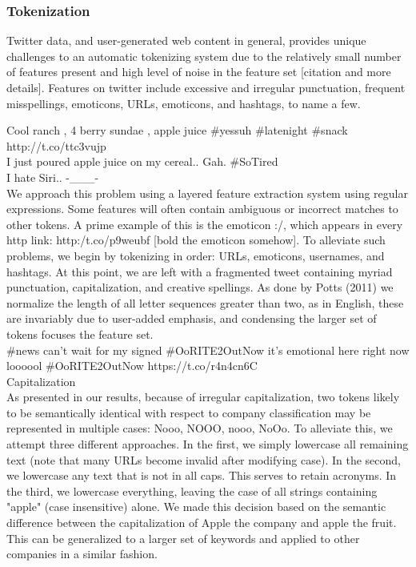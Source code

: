 \documentclass[letterpaper]{article}
\begin{document}
\subsubsection{Tokenization}
Twitter data, and user-generated web content in general, provides unique challenges to an automatic tokenizing system due to the relatively small number of features present and high level of noise in the feature set [citation and more details]. Features on twitter include excessive and irregular punctuation, frequent misspellings, emoticons, URLs, emoticons, and hashtags, to name a few.

Cool ranch , 4 berry sundae , apple juice #yessuh #latenight #snack http://t.co/ttc3vujp \\
I just poured apple juice on my cereal.. Gah. #SoTired \\
I hate Siri.. -___- \\

We approach this problem using a layered feature extraction system using regular expressions. Some features will often contain ambiguous or incorrect matches to other tokens. A prime example of this is the emoticon :/, which appears in every http link: http:/t.co/p9weubf [bold the emoticon somehow]. To alleviate such problems, we begin by tokenizing in order: URLs, emoticons, usernames, and hashtags. At this point, we are left with a fragmented tweet containing myriad punctuation, capitalization, and creative spellings. As done by Potts (2011) we normalize the length of all letter sequences greater than two, as in English, these are invariably due to user-added emphasis, and condensing the larger set of tokens focuses the feature set.\\

#news can't wait for my signed #OoRITE2OutNow it's emotional here right now loooool #OoRITE2OutNow https://t.co/r4n4cn6C \\

Capitalization\\
As presented in our results, because of irregular capitalization, two tokens likely to be semantically identical with respect to company classification may be represented in multiple cases: {Nooo, NOOO, nooo, NoOo}. To alleviate this, we attempt three different approaches. In the first, we simply lowercase all remaining text (note that many URLs become invalid after modifying case). In the second, we lowercase any text that is not in all caps. This serves to retain acronyms. In the third, we lowercase everything, leaving the case of all strings containing "apple" (case insensitive) alone. We made this decision based on the semantic difference between the capitalization of Apple the company and apple the fruit. This can be generalized to a larger set of keywords and applied to other companies in a similar fashion. 
\end{document}
